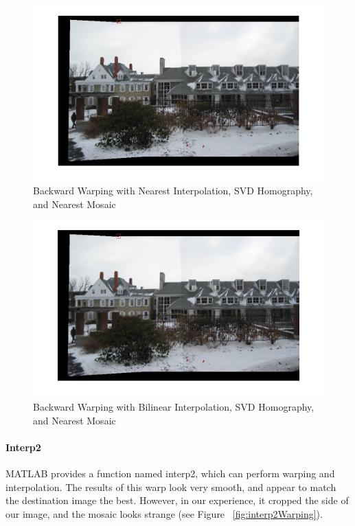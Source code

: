 \documentclass[11pt, letterpaper]{article}
\begin{document}
\begin{figure}[here]
\includegraphics[width=\textwidth]{../pics/snow-svd-backward-nearest-nearest.jpg}
\caption{Backward Warping with Nearest Interpolation, 
  SVD Homography, and Nearest Mosaic}
\label{fig:backwardNearestWarping}
\end{figure}

\begin{figure}[here]
\includegraphics[width=\textwidth]{../pics/snow-svd-backward-bilinear-nearest.jpg}
\caption{Backward Warping with Bilinear Interpolation, 
  SVD Homography, and Nearest Mosaic}
\label{fig:backwardBilinearWarping}
\end{figure}


\paragraph{Interp2}
MATLAB provides a function named interp2, which can perform warping
and interpolation. The results of this warp look very smooth, and
appear to match the destination image the best. However, in our
experience, it cropped the side of our image, and the mosaic looks
strange (see Figure ~\ref{fig:interp2Warping}).
\end{document}
